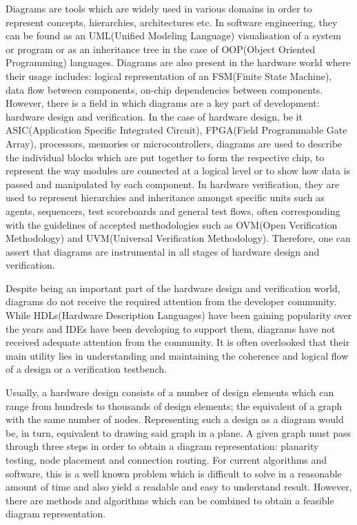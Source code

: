 Diagrams are tools which are widely used in various domains in order to represent
concepts, hierarchies, architectures etc. In software engineering, they can be found as
an UML(Unified Modeling Language) visualisation of a system or program or as an inheritance
tree in the case of OOP(Object Oriented Programming) languages. Diagrams are also present 
in the hardware world where their usage includes: logical representation of an FSM(Finite State Machine), 
data flow between components, on-chip dependencies between components. However, there is a field in 
which diagrams are a key part of development: hardware design and verification. In the case of hardware design, 
be it ASIC(Application Specific Integrated Circuit), FPGA(Field Programmable Gate Array), processors, memories or
microcontrollers, diagrams are used to describe the individual blocks which are put together to form the respective chip, 
to represent the way modules are connected at a logical level or to show how data is passed and manipulated by each component. 
In hardware verification, they are used to represent hierarchies and inheritance amongst specific units such as agents, 
sequencers, test scoreboards and general test flows, often corresponding with the guidelines of accepted methodologies such
as OVM(Open Verification Methodology) and UVM(Universal Verification Methodology). Therefore, one can assert that diagrams 
are instrumental in all stages of hardware design and verification.

Despite being an important part of the hardware design and verification world, diagrams do not receive the required attention 
from the developer community. While HDLs(Hardware Description Languages) have been gaining popularity over the years and IDEs 
have been developing to support them, diagrams have not received adequate attention from the community. It is often 
overlooked that their main utility lies in understanding and maintaining the coherence and logical flow of a design
or a verification testbench. 

Usually, a hardware design consists of a number of design elements which can range from hundreds to thousands of design elements; 
the equivalent of a graph with the same number of nodes. Representing such a design as a diagram would be, in turn, equivalent to 
drawing said graph in a plane. A given graph must pass through three steps in order to obtain a diagram representation: planarity 
testing, node placement and connection routing. For current algorithms and software, this is a well known problem which is difficult 
to solve in a reasonable amount of time and also yield a readable and easy to understand result. However, there are methods and 
algorithms which can be combined to obtain a feasible diagram representation. 

